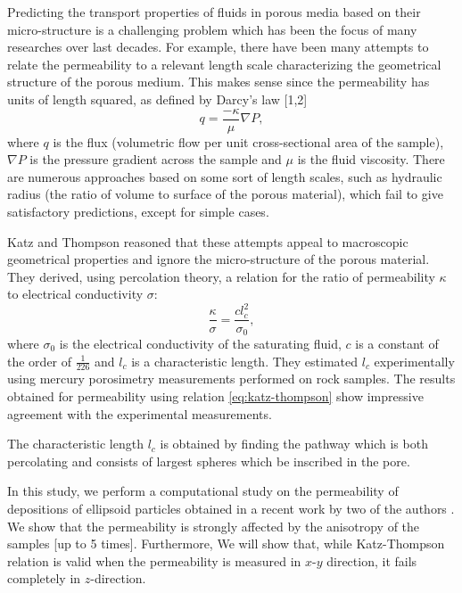 \documentclass[aps,twocolumn,superscriptaddress,showpacs,showkeys]{revtex4}
\begin{document}
Predicting the transport properties of fluids in porous media based on their micro-structure 
is a challenging problem which has been the focus of many researches over last decades. 
For example, there have been many attempts to relate the permeability to 
a relevant length scale characterizing the geometrical structure of the porous medium. 
This makes sense since the permeability has units of length squared, as defined 
by Darcy's law [1,2] %
\begin{equation}
q=\frac{-\kappa}{\mu} \nabla P,
\end{equation}
where $q$ is the flux (volumetric flow per unit cross-sectional area of the sample), 
$\nabla P$ is the pressure gradient across the sample and $\mu$ is the fluid viscosity.
There are numerous approaches based on some sort of length scales, such as hydraulic radius 
(the ratio of volume to surface of the porous material), which fail to give satisfactory 
predictions, except for simple cases.

Katz and Thompson \cite{ref:KatzThompson1986} reasoned that these attempts appeal to 
macroscopic geometrical properties and ignore the micro-structure of the porous material.
They derived, using percolation theory, a relation for the ratio of permeability $\kappa$ to electrical 
conductivity $\sigma$:
\begin{equation}
\frac{\kappa}{\sigma}=\frac{c l_c^2}{\sigma_0},
\label{eq:katz-thompson}
\end{equation}
where $\sigma_0$ is the electrical conductivity of the saturating fluid, $c$ is a constant of 
the order of $\frac{1}{226}$ and $l_c$ is a characteristic length. 
They estimated $l_c$ experimentally using mercury porosimetry measurements performed on rock samples. 
The results obtained for permeability using relation \ref{eq:katz-thompson} 
show impressive agreement with the experimental measurements. 

The characteristic length $l_c$ is obtained by finding the pathway 
which is both percolating and consists of largest spheres which be 
inscribed in the pore. 

In this study, we perform a computational study on the permeability of depositions of ellipsoid 
particles obtained in a recent work by two of the authors \cite{ref:reza-pedro2011}. 
We show that the permeability is strongly affected by the anisotropy of the samples [up to 5 times].
Furthermore, We will show that, while Katz-Thompson relation is valid when the permeability is 
measured in $x$-$y$ direction, it fails completely in $z$-direction. 
\end{document}
